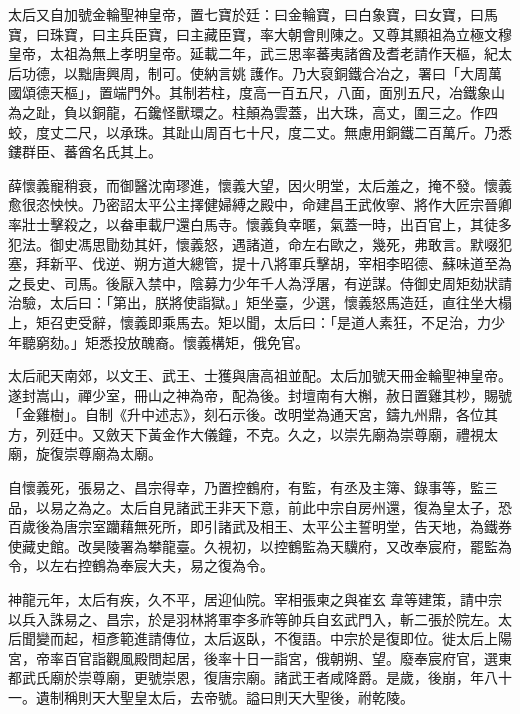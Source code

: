 \begin{pinyinscope}
 太后又自加號金輪聖神皇帝，置七寶於廷：曰金輪寶，曰白象寶，曰女寶，曰馬寶，曰珠寶，曰主兵臣寶，曰主藏臣寶，率大朝會則陳之。又尊其顯祖為立極文穆皇帝，太祖為無上孝明皇帝。延載二年，武三思率蕃夷諸酋及耆老請作天樞，紀太后功德，以黜唐興周，制可。使納言姚護作。乃大裒銅鐵合冶之，署曰「大周萬國頌德天樞」，置端門外。其制若柱，度高一百五尺，八面，面別五尺，冶鐵象山為之趾，負以銅龍，石鑱怪獸環之。柱顛為雲蓋，出大珠，高丈，圍三之。作四蛟，度丈二尺，以承珠。其趾山周百七十尺，度二丈。無慮用銅鐵二百萬斤。乃悉鏤群臣、蕃酋名氏其上。



 薛懷義寵稍衰，而御醫沈南璆進，懷義大望，因火明堂，太后羞之，掩不發。懷義愈很恣怏怏。乃密詔太平公主擇健婦縛之殿中，命建昌王武攸寧、將作大匠宗晉卿率壯士擊殺之，以畚車載尸還白馬寺。懷義負幸暱，氣蓋一時，出百官上，其徒多犯法。御史馮思勖劾其奸，懷義怒，遇諸道，命左右歐之，幾死，弗敢言。默啜犯塞，拜新平、伐逆、朔方道大總管，提十八將軍兵擊胡，宰相李昭德、蘇味道至為之長史、司馬。後厭入禁中，陰募力少年千人為浮屠，有逆謀。侍御史周矩劾狀請治驗，太后曰：「第出，朕將使詣獄。」矩坐臺，少選，懷義怒馬造廷，直往坐大榻上，矩召吏受辭，懷義即乘馬去。矩以聞，太后曰：「是道人素狂，不足治，力少年聽窮劾。」矩悉投放醜裔。懷義構矩，俄免官。



 太后祀天南郊，以文王、武王、士獲與唐高祖並配。太后加號天冊金輪聖神皇帝。遂封嵩山，禪少室，冊山之神為帝，配為後。封壇南有大槲，赦日置雞其杪，賜號「金雞樹」。自制《升中述志》，刻石示後。改明堂為通天宮，鑄九州鼎，各位其方，列廷中。又斂天下黃金作大儀鐘，不克。久之，以崇先廟為崇尊廟，禮視太廟，旋復崇尊廟為太廟。



 自懷義死，張易之、昌宗得幸，乃置控鶴府，有監，有丞及主簿、錄事等，監三品，以易之為之。太后自見諸武王非天下意，前此中宗自房州還，復為皇太子，恐百歲後為唐宗室躪藉無死所，即引諸武及相王、太平公主誓明堂，告天地，為鐵券使藏史館。改昊陵署為攀龍臺。久視初，以控鶴監為天驥府，又改奉宸府，罷監為令，以左右控鶴為奉宸大夫，易之復為令。



 神龍元年，太后有疾，久不平，居迎仙院。宰相張柬之與崔玄韋等建策，請中宗以兵入誅易之、昌宗，於是羽林將軍李多祚等帥兵自玄武門入，斬二張於院左。太后聞變而起，桓彥範進請傳位，太后返臥，不復語。中宗於是復即位。徙太后上陽宮，帝率百官詣觀風殿問起居，後率十日一詣宮，俄朝朔、望。廢奉宸府官，選東都武氏廟於崇尊廟，更號崇恩，復唐宗廟。諸武王者咸降爵。是歲，後崩，年八十一。遺制稱則天大聖皇太后，去帝號。謚曰則天大聖後，祔乾陵。




\end{pinyinscope}
